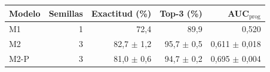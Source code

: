 \begin{tabular}{lrrrr}
\toprule
Modelo & Semillas & Exactitud (\%) & Top-3 (\%) & AUC$_{\mathrm{prog}}$ \\
\midrule
M1 & 1 & 72,4 & 89,9 & 0,520 \\
M2 & 3 & 82,7 $\pm$ 1,2 & 95,7 $\pm$ 0,5 & 0,611 $\pm$ 0,018 \\
M2-P & 3 & 81,0 $\pm$ 0,6 & 94,7 $\pm$ 0,2 & 0,695 $\pm$ 0,004 \\
\bottomrule
\end{tabular}
